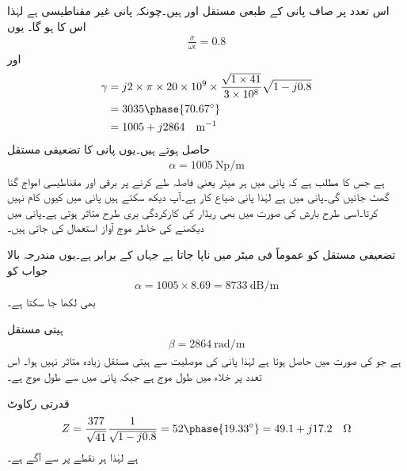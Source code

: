 اس تعدد پر صاف پانی کے طبعی مستقل  اور  ہیں۔چونکہ پانی غیر مقناطیسی ہے لہٰذا اس کا  ہو گا۔ یوں
\begin{align*}
\frac{\sigma}{\omega \epsilon}=0.8
\end{align*}
اور
\begin{align*}
\gamma&=j 2\times \pi \times 20\times 10^9 \times \frac{\sqrt{1\times 41}}{3\times 10^8} \sqrt{1-j 0.8}\\
&=3035 \phase{70.67^{\circ}}\\
&=1005+j2864 \quad \si{\meter^{-1}}
\end{align*}
حاصل ہوتے ہیں۔یوں پانی کا تضعیفی مستقل
\begin{align*}
\alpha=\SI{1005}{\neper \per \meter}
\end{align*}
ہے جس کا مطلب ہے کہ پانی میں ہر  میٹر یعنی  فاصلہ طے  کرنے پر برقی اور مقناطیسی امواج  گنا گھٹ جائیں گی۔پانی میں  ہے لہٰذا پانی ضیاع کار ہے۔آپ دیکھ سکتے ہیں  پانی میں کیوں کام نہیں کرتا۔اسی طرح بارش کی صورت میں بھی ریڈار کی کارکردگی بری طرح متاثر ہوتی ہے۔پانی میں دیکھنے کی خاطر موج آواز استعمال کی جاتی ہیں۔

تضعیفی مستقل کو عموماً  فی میٹر میں ناپا جاتا ہے جہاں  کے برابر ہے۔یوں مندرجہ بالا جواب کو
\begin{align*}
\alpha=1005\times 8.69=\SI{8733}{\deci\bel\per\meter}
\end{align*}
بھی لکھا جا سکتا ہے۔

ہیتی مستقل
\begin{align*}
\beta=\SI{2864}{\radian \per \meter}
\end{align*}
ہے جو  کی صورت میں  حاصل ہوتا ہے لہٰذا پانی کی موصلیت سے ہیتی مستقل زیادہ متاثر نہیں ہوا۔ اس تعدد پر خلاء میں طول موج  ہے جبکہ پانی میں  سے طول موج  ہے۔

قدرتی رکاوٹ
\begin{align*}
Z=\frac{377}{\sqrt{41}}\frac{1}{\sqrt{1-j 0.8}}=52\phase{19.33^\circ}=49.1+j17.2 \quad \si{\ohm}
\end{align*}
ہے لہٰذا  ہر نقطے پر  سے  آگے ہے۔


